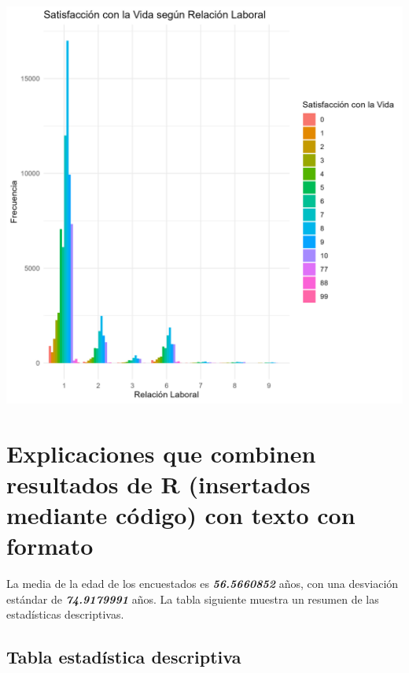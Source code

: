 \documentclass{article}\usepackage[]{graphicx}\usepackage[]{xcolor}
\makeatletter
\def\maxwidth{ %
  \ifdim\Gin@nat@width>\linewidth
    \linewidth
  \else
    \Gin@nat@width
  \fi
}
\makeatother
\begin{document}
\includegraphics[width=\maxwidth]{satisfaccion_vida_relacion_laboral} 


\section{Explicaciones que combinen resultados de R (insertados mediante código) con texto con formato}

La media de la edad de los encuestados es \textbf{\emph{56.5660852}} años, con una desviación estándar de \textbf{\emph{74.9179991}} años. La tabla siguiente muestra un resumen de las estadísticas descriptivas.

\subsection{Tabla estadística descriptiva}
\end{document}
